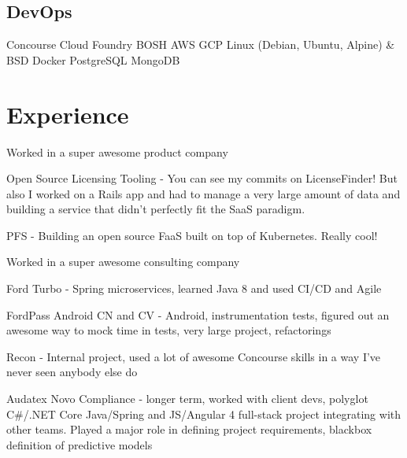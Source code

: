 \documentclass[letterpaper]{deedy-resume}
\begin{document}
\begin{minipage}[t]{0.33\textwidth}
\sectionspace

\subsection{DevOps}

Concourse \textbullet{} Cloud Foundry \textbullet{} BOSH \textbullet{}
AWS \textbullet{} GCP \textbullet{} Linux (Debian, Ubuntu, Alpine) \& BSD
\textbullet{} Docker \textbullet{} PostgreSQL \textbullet{} MongoDB


\sectionspace

\end{minipage}
\hfill
\begin{minipage}[t]{0.66\textwidth}

\section{Experience}


Worked in a super awesome product company
\vspace{\topsep}
\begin{tightitemize}
\item Open Source Licensing Tooling - You can see my commits on LicenseFinder!
But also I worked on a Rails app and had to manage a very large amount of data and
building a service that didn't perfectly fit the SaaS paradigm.
\item PFS - Building an open source FaaS built on top of Kubernetes. Really cool!
\end{tightitemize}

\sectionspace


Worked in a super awesome consulting company
\vspace{\topsep}
\begin{tightitemize}
\item Ford Turbo - Spring microservices, learned Java 8 and used CI/CD and Agile
\item FordPass Android CN and CV - Android, instrumentation tests, figured out
an awesome way to mock time in tests, very large project, refactorings
\item Recon - Internal project, used a lot of awesome Concourse skills in a way
I've never seen anybody else do
\item Audatex Novo Compliance - longer term, worked with client devs, polyglot
C\#/.NET Core Java/Spring and JS/Angular 4 full-stack project integrating with
other teams. Played a major role in defining project requirements, blackbox
definition of predictive models
\end{tightitemize}


\end{minipage}
\end{document}
